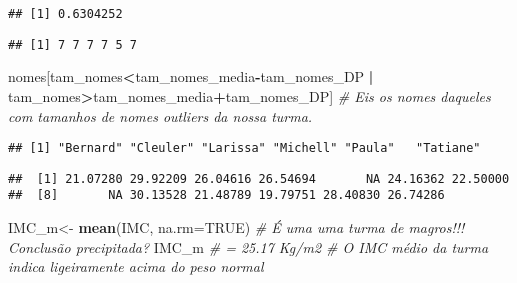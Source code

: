 \documentclass[]{article}
\newenvironment{Shaded}{\begin{snugshade}}{\end{snugshade}}
\newcommand{\KeywordTok}[1]{\textcolor[rgb]{0.13,0.29,0.53}{\textbf{#1}}}
\newcommand{\DataTypeTok}[1]{\textcolor[rgb]{0.13,0.29,0.53}{#1}}
\newcommand{\DecValTok}[1]{\textcolor[rgb]{0.00,0.00,0.81}{#1}}
\newcommand{\StringTok}[1]{\textcolor[rgb]{0.31,0.60,0.02}{#1}}
\newcommand{\CommentTok}[1]{\textcolor[rgb]{0.56,0.35,0.01}{\textit{#1}}}
\newcommand{\OtherTok}[1]{\textcolor[rgb]{0.56,0.35,0.01}{#1}}
\newcommand{\OperatorTok}[1]{\textcolor[rgb]{0.81,0.36,0.00}{\textbf{#1}}}
\newcommand{\NormalTok}[1]{#1}
\begin{document}
\begin{verbatim}
## [1] 0.6304252
\end{verbatim}

\begin{Shaded}
\end{Shaded}

\begin{verbatim}
## [1] 7 7 7 7 5 7
\end{verbatim}

\begin{Shaded}
\begin{Highlighting}[]
\NormalTok{nomes[tam_nomes}\OperatorTok{<}\NormalTok{tam_nomes_media}\OperatorTok{-}\NormalTok{tam_nomes_DP }\OperatorTok{|}\StringTok{ }\NormalTok{tam_nomes}\OperatorTok{>}\NormalTok{tam_nomes_media}\OperatorTok{+}\NormalTok{tam_nomes_DP] }\CommentTok{# Eis os nomes daqueles com tamanhos de nomes outliers da nossa turma.}
\end{Highlighting}
\end{Shaded}

\begin{verbatim}
## [1] "Bernard" "Cleuler" "Larissa" "Michell" "Paula"   "Tatiane"
\end{verbatim}

\begin{Shaded}
\end{Shaded}

\begin{verbatim}
##  [1] 21.07280 29.92209 26.04616 26.54694       NA 24.16362 22.50000
##  [8]       NA 30.13528 21.48789 19.79751 28.40830 26.74286
\end{verbatim}

\begin{Shaded}
\begin{Highlighting}[]
\NormalTok{IMC_m<-}\StringTok{ }\KeywordTok{mean}\NormalTok{(IMC, }\DataTypeTok{na.rm=}\OtherTok{TRUE}\NormalTok{) }\CommentTok{# É uma uma turma de magros!!! Conclusão precipitada?}
\NormalTok{IMC_m }\CommentTok{# = 25.17 Kg/m2     # O IMC médio da turma indica ligeiramente acima do peso normal}
\end{Highlighting}
\end{Shaded}
\end{document}
